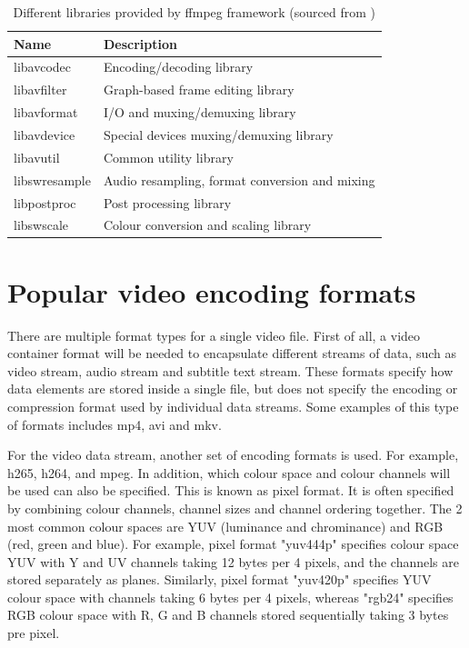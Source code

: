 \begin{table}[!h]
  \centering
  \begin{tabular}{l|l}
    \hline
    \textbf{Name} & \textbf{Description} \\
    \hline
    libavcodec & Encoding/decoding library  \\ \hline
    libavfilter & Graph-based frame editing library \\ \hline
    libavformat & I/O and muxing/demuxing library   \\ \hline
    libavdevice & Special devices muxing/demuxing library \\ \hline
    libavutil & Common utility library    \\ \hline
    libswresample & Audio resampling, format conversion and mixing  \\ \hline
    libpostproc & Post processing library \\ \hline
    libswscale & Colour conversion and scaling library  \\ \hline
  \end{tabular}
  \caption{Different libraries provided by ffmpeg framework (sourced from \cite{ffmpeg})}
  \label{tbl:ffmpeg}
\end{table}

\section{Popular video encoding formats}

There are multiple format types for a single video file. First of all, a video container format will be needed to encapsulate different streams of data, such as video stream, audio stream and subtitle text stream. These formats specify how data elements are stored inside a single file, but does not specify the encoding or compression format used by individual data streams. Some examples of this type of formats includes mp4, avi and mkv.

For the video data stream, another set of encoding formats is used. For example, h265, h264, and mpeg. In addition, which colour space and colour channels will be used can also be specified. This is known as pixel format. It is often specified by combining colour channels, channel sizes and channel ordering together. The 2 most common colour spaces are YUV (luminance and chrominance) and RGB (red, green and blue). For example, pixel format "yuv444p" specifies colour space YUV with Y and UV channels taking 12 bytes per 4 pixels, and the channels are stored separately as planes. Similarly, pixel format "yuv420p" specifies YUV colour space with channels taking 6 bytes per 4 pixels, whereas "rgb24" specifies RGB colour space with R, G and B channels stored sequentially taking 3 bytes pre pixel.

